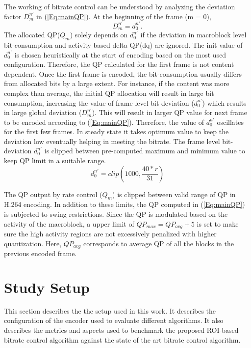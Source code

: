 \documentclass[11pt]{article} %
\begin{document}
The working of bitrate control can be understood by analyzing the deviation factor $D_m^{n'}$ in (\ref{Eq:mainQP}). At the beginning of the frame (m = 0), $$D_m^{n'} = d_0^{n'}.$$ 
The allocated QP($Q_m$) solely depends on $d_0^{n'}$ if the deviation in macroblock level bit-consumption and activity based delta QP(dq) are ignored. The init value of $d_0^{n'}$ is chosen heuristically at the start of encoding based on the most used configuration. Therefore, the QP calculated for the first frame is not content dependent. Once the first frame is encoded, the bit-consumption usually differs from allocated bits by a large extent. For instance, if the content was more complex than average, the initial QP allocation will result in large bit consumption, increasing the value of frame level bit deviation ($d_0^{n'}$) which results in large global deviation ($D_m^{n'}$). This will result in larger QP value for next frame to be encoded according to (\ref{Eq:mainQP}). Therefore, the value of $d_0^{n'}$ oscillates for the first few frames. In steady state it takes optimum value to keep the deviation low eventually helping in meeting the bitrate. The frame level bit-deviation $d_0^{n'}$ is clipped between pre-computed maximum and minimum value to keep QP limit in a suitable range.
\begin{equation}
\label{Eq:DevClip}
d_0^{n'} = clip(1000, \frac{40 * r}{31})
\end{equation}

The QP output by rate control ($Q_m$) is clipped between valid range of QP in H.264 encoding. In addition to these limits, the QP computed in (\ref{Eq:mainQP}) is subjected to swing restrictions. Since the QP is modulated based on the activity of the macroblock, a upper limit of $QP_{max} = QP_{avg} + 5$ is set to make sure the high activity regions are not excessively penalized with higher quantization. Here, $QP_{avg}$ corresponds to average QP of all the blocks in the previous encoded frame.

\section{Study Setup}
This section describes the the setup used in this work. It describes the configuration of the encoder used to evaluate different algorithms. It also describes the metrics and aspects used to benchmark the proposed ROI-based bitrate control algorithm against the state of the art bitrate control algorithm.
\end{document}
